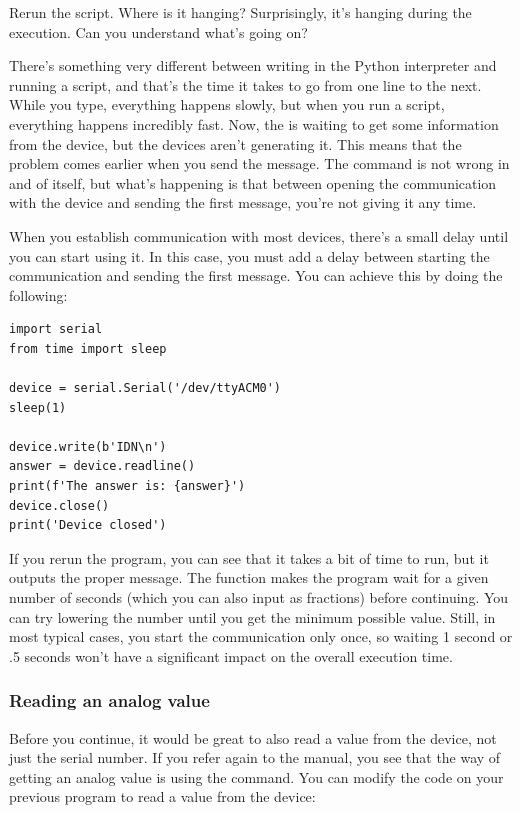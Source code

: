 Rerun the script. Where is it hanging? Surprisingly, it's hanging during the  execution. Can you understand what's going on?

There's something very different between writing in the Python interpreter and running a script, and that's the time it takes to go from one line to the next. While you type, everything happens slowly, but when you run a script, everything happens incredibly fast. Now, the  is waiting to get some information from the device, but the devices aren't generating it. This means that the problem comes earlier when you send the  message. The command is not wrong in and of itself, but what's happening is that between opening the communication with the device and sending the first message, you're not giving it any time.

When you establish communication with most devices, there's a small delay until you can start using it. In this case, you must add a delay between starting the communication and sending the first message. You can achieve this by doing the following:

\begin{verbatim}
import serial
from time import sleep

device = serial.Serial('/dev/ttyACM0')
sleep(1)

device.write(b'IDN\n')
answer = device.readline()
print(f'The answer is: {answer}')
device.close()
print('Device closed')
\end{verbatim}

If you rerun the program, you can see that it takes a bit of time to run, but it outputs the proper message. The  function makes the program wait for a given number of seconds (which you can also input as fractions) before continuing. You can try lowering the number until you get the minimum possible value. Still, in most typical cases, you start the communication only once, so waiting 1 second or .5 seconds won't have a significant impact on the overall execution time.

\subsubsection{Reading an analog value}
Before you continue, it would be great to also read a value from the device, not just the serial number. If you refer again to the manual, you see that the way of getting an analog value is using the  command. You can modify the code on your previous program to read a value from the device:

